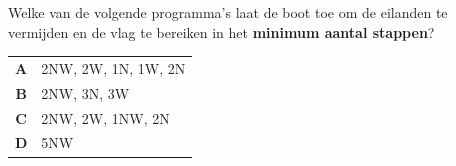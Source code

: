 \documentclass[12pt, a4paper]{article}
\begin{document}
\begin{minipage}{\textwidth}
			Welke van de volgende programma's laat de boot toe om de eilanden te vermijden en de vlag te bereiken in het \textbf{minimum aantal stappen}?
	
			\begin{table}[H]
				\centering
				\begin{tabular}{|c l|}
					\hline
					\textbf{A} &  2NW, 2W, 1N, 1W, 2N \\ 
					\textbf{B} &  2NW, 3N, 3W \\
					\textbf{C} &  2NW, 2W, 1NW, 2N \\ 
					\textbf{D} &  5NW \\ 
					\hline
				\end{tabular}
			\end{table}
	\end{minipage} \\ \\
	
\end{document}
